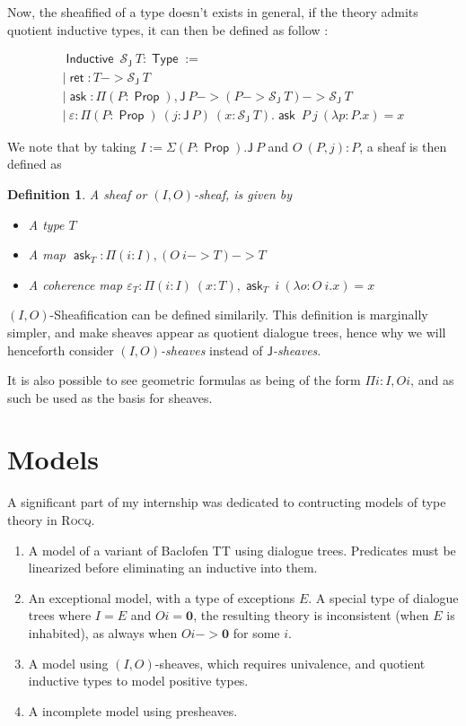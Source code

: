 \documentclass[11pt]{article}
\newtheorem{definition}[theorem]{Definition}
\DeclareMathOperator{\Prop}{\mathsf{Prop}}
\DeclareMathOperator{\Type}{\mathsf{Type}}
\DeclareMathOperator{\ask}{\mathsf{ask}}
\DeclareMathOperator{\Inductive}{\mathsf{Inductive}}
\DeclareMathOperator{\ret}{\mathsf{ret}}
\newcommand{\0}{\mathbf{0}}
\newcommand{\1}{\mathbf{1}}
\begin{document}
Now, the sheafified of a type doesn't exists in general, if the theory admits quotient inductive types, it can then be defined as follow :

$$
\begin{array}{l}
    \Inductive\ \mathcal{S}_{\mathsf{J}}\ T : \Type := \\
    | \ret : T -> \mathcal{S}_{\mathsf{J}}\ T\\
    | \ask : \Pi (P:\Prop), \mathsf{J}\ P -> (P -> \mathcal{S}_{\mathsf{J}}\ T) -> \mathcal{S}_{\mathsf{J}}\ T\\
    |\ \varepsilon : \Pi (P:\Prop)\ (j : \mathsf J\ P)\ (x : \mathcal{S}_{\mathsf{J}}\ T). \ask\ P\ j\ (\lambda p:P. x) = x
\end{array}
$$

We note that by taking $I := \Sigma (P:\Prop). \mathsf{J}\ P$ and $O\ (P,j) : P$, a sheaf is then defined as
\begin{definition}\label{IOshf}
    A \emph{sheaf} or \emph{$(I,O)$-sheaf}, is given by
\begin{itemize}
    \item A type $T$
    \item A map $\ask_T : \Pi (i:I), (O\ i -> T) -> T$
    \item A coherence map $\varepsilon_T : \Pi(i:I)\ (x:T), \ask_T\ i\ (\lambda o:O\  i.x) = x$
\end{itemize}

\end{definition}

$(I,O)$-Sheafification can be defined similarily. This definition is marginally simpler, and make sheaves appear as quotient dialogue trees, hence why we will henceforth consider \emph{$(I,O)$-sheaves} instead of \emph{$\mathsf{J}$-sheaves}.

It is also possible to see geometric formulas as being of the form $\Pi i : I, O i$, and as such be used as the basis for sheaves.

\section{Models}

A significant part of my internship was dedicated to contructing models of type theory in \textsc{Rocq}.

\begin{enumerate}
    \item A model of a variant of Baclofen TT using dialogue trees. Predicates must be linearized before eliminating an inductive into them.
    \item An exceptional model, with a type of exceptions $E$. A special type of dialogue trees where $I = E$ and $O i = \mathbf{0}$, the resulting theory is inconsistent (when $E$ is inhabited), as always when $O i -> \mathbf{0}$ for some $i$.
    \item A model using $(I,O)$-sheaves, which requires univalence, and quotient inductive types to model positive types.
    \item A incomplete model using presheaves.
\end{enumerate}
\end{document}
